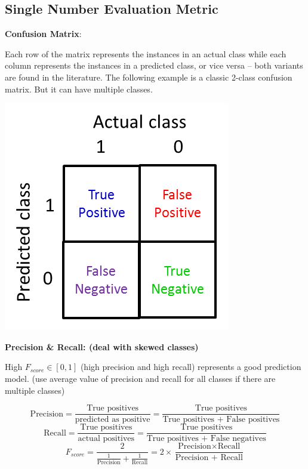 \documentclass{article}
\begin{document}
\subsection{Single Number Evaluation Metric}

\noindent \textbf{Confusion Matrix}:

\noindent Each row of the matrix represents the instances in an actual class while each column represents the instances in a predicted class, or vice versa – both variants are found in the literature. The following example is a classic 2-class confusion matrix. But it can have multiple classes.

\begin{center}
\includegraphics[scale=0.6]{./images/confusion_matrix.png}
\end{center}

\noindent \textbf{Precision \& Recall: (deal with skewed classes)}

\noindent High \(F_{score} \in [0, 1]\) (high precision and high recall) represents a good prediction model. (use average value of precision and recall for all classes if there are multiple classes)

\[\text{Precision} = \frac{\text{True positives}}{\text{predicted as positive}} = \frac{\text{True positives}}{\text{True positives + False positives}}\]
\[\text{Recall} = \frac{\text{True positives}}{\text{actual positives}} = \frac{\text{True positives}}{\text{True positives + False negatives}}\]
\[F_{score} = \frac{2}{\frac{1}{\text{Precision}} + \frac{1}{\text{Recall}}} = 2 \times \frac{\text{Precision} \times \text{Recall}}{\text{Precision + Recall}}\]
\end{document}
